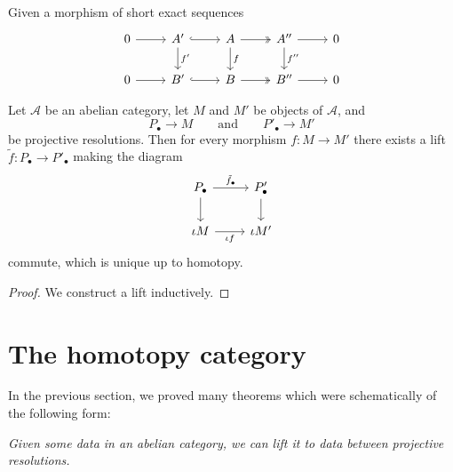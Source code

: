 \documentclass[main.tex]{subfiles}
\begin{document}
\begin{theorem}
  \label{thm:horseshoe_lemma_for_morphisms}
  Given a morphism of short exact sequences
  \begin{equation*}
    \begin{tikzcd}
      0
      \arrow[r]
      & A'
      \arrow[r, hook]
      \arrow[d, "f'"]
      & A
      \arrow[r, two heads]
      \arrow[d, "f"]
      & A''
      \arrow[r]
      \arrow[d, "f''"]
      & 0
      \\
      0
      \arrow[r]
      & B'
      \arrow[r, hook]
      & B
      \arrow[r, two heads]
      & B''
      \arrow[r]
      & 0
    \end{tikzcd}
  \end{equation*}
\end{theorem}

\begin{proposition}
  \label{prop:can_lift_morphisms_to_projective_resolutions}
  Let $\mathcal{A}$ be an abelian category, let $M$ and $M'$ be objects of $\mathcal{A}$, and
  \begin{equation*}
    P_{\bullet} \to M \qquad\text{and}\qquad P'_{\bullet} \to M'
  \end{equation*}
  be projective resolutions. Then for every morphism $f\colon M \to M'$ there exists a lift $\tilde{f}\colon P_{\bullet} \to P'_{\bullet}$ making the diagram
  \begin{equation*}
    \begin{tikzcd}
      P_{\bullet}
      \arrow[r, "\tilde{f}_{\bullet}"]
      \arrow[d]
      & P'_{\bullet}
      \arrow[d]
      \\
      \iota M
      \arrow[r, swap, "\iota f"]
      & \iota M'
    \end{tikzcd}
  \end{equation*}
  commute, which is unique up to homotopy.
\end{proposition}
\begin{proof}
  We construct a lift inductively.
\end{proof}


\section{The homotopy category}
\label{sec:the_homotopy_category}

In the previous section, we proved many theorems which were schematically of the following form:

\emph{Given some data in an abelian category, we can lift it to data between projective resolutions.}
\end{document}
